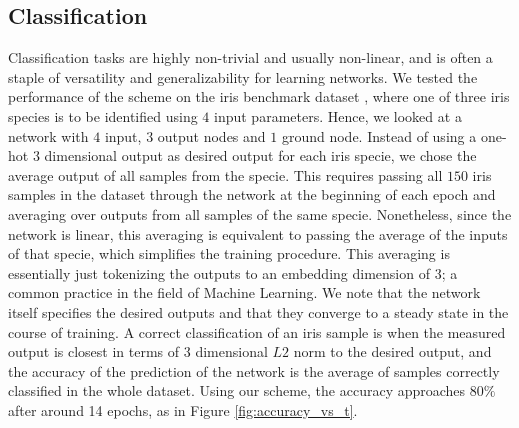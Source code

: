 \documentclass[%
 reprint,
 amsmath,amssymb,
 aps,
]{revtex4-2}
\begin{document}
\subsection{Classification}\label{sec:Classification}

    Classification tasks are highly non-trivial and usually non-linear, and is often a staple of versatility and generalizability for learning networks. We tested the performance of the scheme on the iris benchmark dataset \cite{fisher1936use}, where one of three iris species is to be identified using $4$ input parameters. Hence, we looked at a network with $4$ input, $3$ output nodes and $1$ ground node. Instead of using a one-hot $3$ dimensional output as desired output for each iris specie, we chose the average output of all samples from the specie. This requires passing all $150$ iris samples in the dataset through the network at the beginning of each epoch and averaging over outputs from all samples of the same specie. Nonetheless, since the network is linear, this averaging is equivalent to passing the average of the inputs of that specie, which simplifies the training procedure. This averaging is essentially just tokenizing the outputs to an embedding dimension of $3$; a common practice in the field of Machine Learning. We note that the network itself specifies the desired outputs and that they converge to a steady state in the course of training. A correct classification of an iris sample is when the measured output is closest in terms of $3$ dimensional $L2$ norm to the desired output, and the accuracy of the prediction of the network is the average of samples correctly classified in the whole dataset. Using our scheme, the accuracy approaches $80\%$ after around 14 epochs, as in Figure \ref{fig:accuracy_vs_t}.
\end{document}
